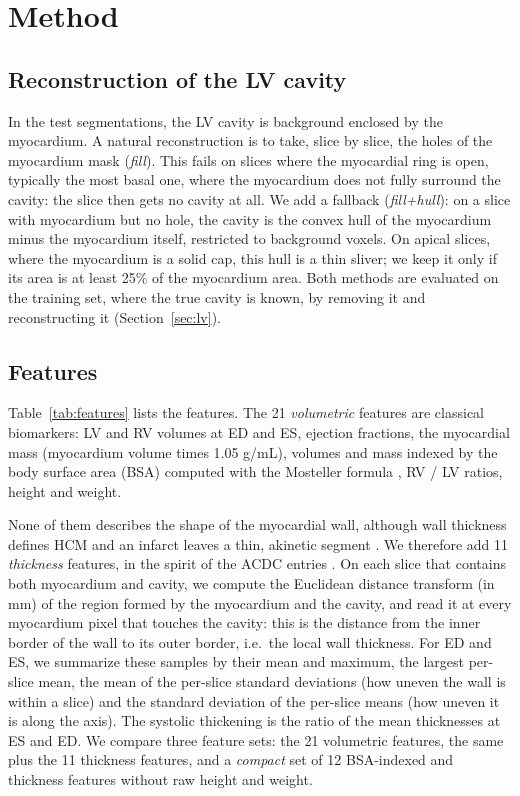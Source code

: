 \section{Method}
\label{sec:method}
\subsection{Reconstruction of the LV cavity}
\label{sec:lv-method}
In the test segmentations, the LV cavity is background enclosed by the myocardium. A natural reconstruction is to take, slice by slice, the holes of the myocardium mask (\emph{fill}). This fails on slices where the myocardial ring is open, typically the most basal one, where the myocardium does not fully surround the cavity: the slice then gets no cavity at all. We add a fallback (\emph{fill+hull}): on a slice with myocardium but no hole, the cavity is the convex hull of the myocardium minus the myocardium itself, restricted to background voxels. On apical slices, where the myocardium is a solid cap, this hull is a thin sliver; we keep it only if its area is at least 25\% of the myocardium area. Both methods are evaluated on the training set, where the true cavity is known, by removing it and reconstructing it (Section~\ref{sec:lv}).

\subsection{Features}
Table~\ref{tab:features} lists the features. The 21 \emph{volumetric} features are classical biomarkers: LV and RV volumes at ED and ES, ejection fractions, the myocardial mass (myocardium volume times 1.05 g/mL), volumes and mass indexed by the body surface area (BSA) computed with the Mosteller formula \citep{mosteller1987}, RV / LV ratios, height and weight.

None of them describes the shape of the myocardial wall, although wall thickness defines HCM \citep{elliott2014} and an infarct leaves a thin, akinetic segment \citep{thygesen2019}. We therefore add 11 \emph{thickness} features, in the spirit of the ACDC entries \citep{isensee2017,wolterink2017,khened2017}. On each slice that contains both myocardium and cavity, we compute the Euclidean distance transform (in mm) of the region formed by the myocardium and the cavity, and read it at every myocardium pixel that touches the cavity: this is the distance from the inner border of the wall to its outer border, i.e.\ the local wall thickness. For ED and ES, we summarize these samples by their mean and maximum, the largest per-slice mean, the mean of the per-slice standard deviations (how uneven the wall is within a slice) and the standard deviation of the per-slice means (how uneven it is along the axis). The systolic thickening is the ratio of the mean thicknesses at ES and ED. We compare three feature sets: the 21 volumetric features, the same plus the 11 thickness features, and a \emph{compact} set of 12 BSA-indexed and thickness features without raw height and weight.

